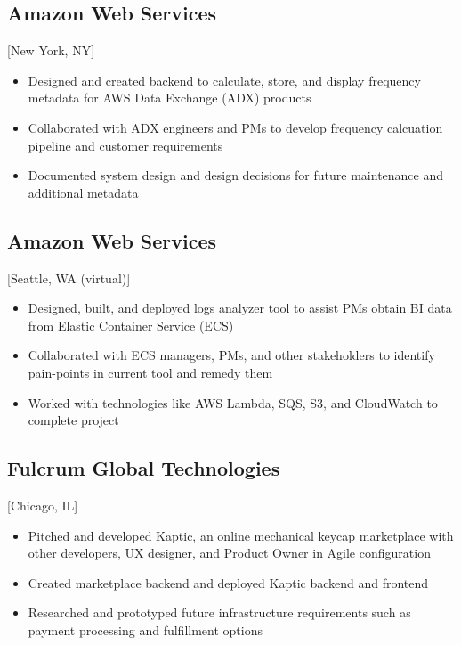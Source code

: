 \documentclass{mycv}
\begin{document}
\subsection{Amazon Web Services}[New York, NY]
\begin{positions}
\end{positions}
\begin{itemize}
  \item Designed and created backend to calculate, store, and display frequency metadata for AWS Data Exchange (ADX) products
  \item Collaborated with ADX engineers and PMs to develop frequency calcuation pipeline and customer requirements
  \item Documented system design and design decisions for future maintenance and additional metadata
\end{itemize}

\subsection{Amazon Web Services}[Seattle, WA (virtual)]
\begin{positions}
\end{positions}
\begin{itemize}
  \item Designed, built, and deployed logs analyzer tool to assist PMs obtain BI data from Elastic Container Service (ECS)
  \item Collaborated with ECS managers, PMs, and other stakeholders to identify pain-points in current tool and remedy them
  \item Worked with technologies like AWS Lambda, SQS, S3, and CloudWatch to complete project
\end{itemize}

\subsection{Fulcrum Global Technologies}[Chicago, IL]
\begin{positions}
\end{positions}
\begin{itemize}
  \item Pitched and developed Kaptic, an online mechanical keycap marketplace with other developers, UX designer, and Product Owner in Agile configuration
  \item Created marketplace backend and deployed Kaptic backend and frontend
  \item Researched and prototyped future infrastructure requirements such as payment processing and fulfillment options
\end{itemize}
\end{document}
